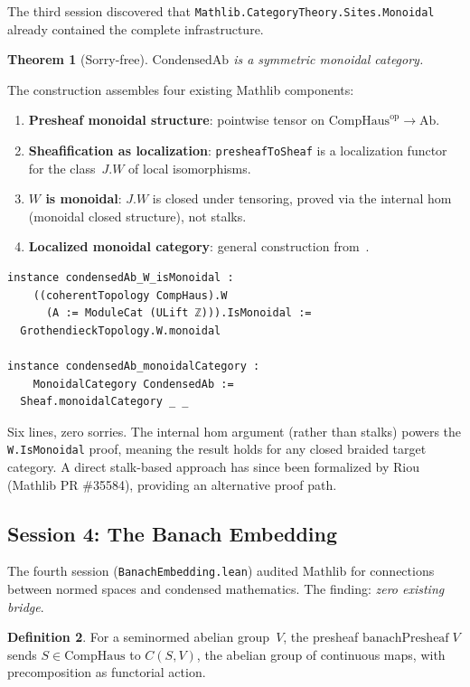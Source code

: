 \documentclass[11pt]{amsart}
\theoremstyle{plain}
\newtheorem{theorem}{Theorem}[section]
\theoremstyle{definition}
\newtheorem{definition}[theorem]{Definition}
\newcommand{\CondAb}{\mathrm{CondensedAb}}
\newcommand{\CompHaus}{\mathrm{CompHaus}}
\newcommand{\Ab}{\mathrm{Ab}}
\newcommand{\op}{\mathrm{op}}
\begin{document}
The third session discovered that \texttt{Mathlib.CategoryTheory.Sites.Monoidal}~\cite{MatlibSitesMon} already contained the complete infrastructure.

\begin{theorem}[Sorry-free]
\label{thm:monoidal}
$\CondAb$ is a symmetric monoidal category.
\end{theorem}

The construction assembles four existing Mathlib components:
\begin{enumerate}
\item \textbf{Presheaf monoidal structure}: pointwise tensor on $\CompHaus^{\op} \to \Ab$.
\item \textbf{Sheafification as localization}: \texttt{presheafToSheaf} is a localization functor for the class~$J.W$ of local isomorphisms.
\item \textbf{$W$ is monoidal}: $J.W$ is closed under tensoring, proved via the internal hom (monoidal closed structure), not stalks.
\item \textbf{Localized monoidal category}: general construction from~\cite{MatlibLocMon}.
\end{enumerate}

\begin{lstlisting}
instance condensedAb_W_isMonoidal :
    ((coherentTopology CompHaus).W
      (A := ModuleCat (ULift ℤ))).IsMonoidal :=
  GrothendieckTopology.W.monoidal

instance condensedAb_monoidalCategory :
    MonoidalCategory CondensedAb :=
  Sheaf.monoidalCategory _ _
\end{lstlisting}

Six lines, zero sorries. The internal hom argument (rather than stalks) powers the \texttt{W.IsMonoidal} proof, meaning the result holds for any closed braided target category. A direct stalk-based approach has since been formalized by Riou (Mathlib PR \#35584), providing an alternative proof path.

\subsection{Session 4: The Banach Embedding}

The fourth session (\texttt{BanachEmbedding.lean}) audited Mathlib for connections between normed spaces and condensed mathematics. The finding: \emph{zero existing bridge}.

\begin{definition}
For a seminormed abelian group~$V$, the presheaf $\mathrm{banachPresheaf}\;V$ sends $S \in \CompHaus$ to $C(S,V)$, the abelian group of continuous maps, with precomposition as functorial action.
\end{definition}
\end{document}
